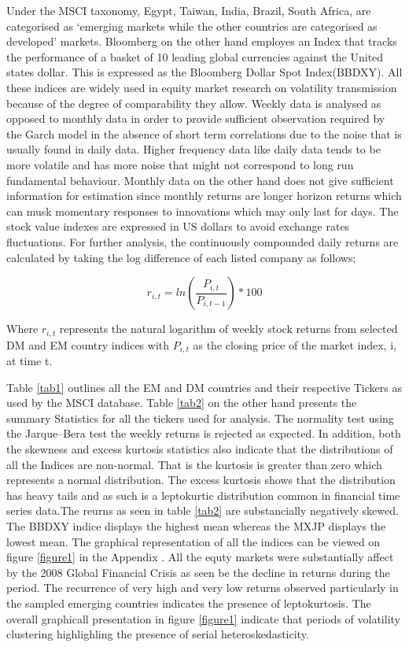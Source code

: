 \documentclass[11pt,preprint, authoryear]{elsarticle}
\numberwithin{equation}{section}
\numberwithin{figure}{section}
\numberwithin{table}{section}
\begin{document}
Under the MSCI taxonomy, Egypt, Taiwan, India, Brazil, South Africa, are
categorised as `emerging markets while the other countries are
categorised as developed' markets. Bloomberg on the other hand employes
an Index that tracks the performance of a basket of 10 leading global
currencies against the United states dollar. This is expressed as the
Bloomberg Dollar Spot Index(BBDXY). All these indices are widely used in
equity market research on volatility transmission because of the degree
of comparability they allow. Weekly data is analysed as opposed to
monthly data in order to provide sufficient observation required by the
Garch model in the absence of short term correlations due to the noise
that is usually found in daily data. Higher frequency data like daily
data tends to be more volatile and has more noise that might not
correspond to long run fundamental behaviour. Monthly data on the other
hand does not give sufficient information for estimation since monthly
returns are longer horizon returns which can musk momentary responses to
innovations which may only last for days. The stock value indexes are
expressed in US dollars to avoid exchange rates fluctuations. For
further analysis, the continuously compounded daily returns are
calculated by taking the log difference of each listed company as
follows;

\[
r_{i,t} = ln (\frac{P_{i,t}}{P_{i,t-1}})*100  
\]

Where \(r_{i,t}\) represents the natural logarithm of weekly stock
returns from selected DM and EM country indices with \(P_{i,t}\) as the
closing price of the market index, i, at time t.

Table \ref{tab1} outlines all the EM and DM countries and their
respective Tickers as used by the MSCI database. Table \ref{tab2} on the
other hand presents the summary Statistics for all the tickers used for
analysis. The normality test using the Jarque--Bera test the weekly
returns is rejected as expected. In addition, both the skewness and
excess kurtosis statistics also indicate that the distributions of all
the Indices are non-normal. That is the kurtosis is greater than zero
which represents a normal distribution. The excess kurtosis shows that
the distribution has heavy tails and as such is a leptokurtic
distribution common in financial time series data.The reurns as seen in
table \ref{tab2} are substancially negatively skewed. The BBDXY indice
displays the highest mean whereas the MXJP displays the lowest mean. The
graphical representation of all the indices can be viewed on figure
\ref{figure1} in the Appendix . All the equty markets were substantially
affect by the 2008 Global Financial Crisis as seen be the decline in
returns during the period. The recurrence of very high and very low
returns observed particularly in the sampled emerging countries
indicates the presence of leptokurtosis. The overall graphicall
presentation in figure \ref{figure1} indicate that periods of volatility
clustering highlighling the presence of serial heteroskedasticity.
\end{document}
